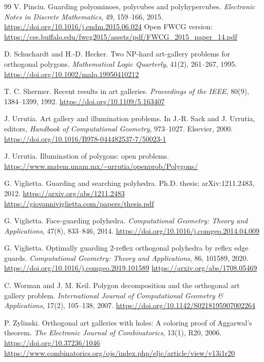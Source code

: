 \documentclass[11pt]{article}
\begin{document}
\begin{thebibliography}{99}
V. Pinciu.
\newblock Guarding polyominoes, polycubes and polyhypercubes.
\newblock \emph{Electronic Notes in Discrete Mathematics}, 49, 159--166, 2015.
\newblock \url{https://doi.org/10.1016/j.endm.2015.06.024}
\newblock Open FWCG version:
\url{https://cse.buffalo.edu/fwcg2015/assets/pdf/FWCG_2015_paper_14.pdf}

D. Schuchardt and H.-D. Hecker.
\newblock Two NP-hard art-gallery problems for orthogonal polygons.
\newblock \emph{Mathematical Logic Quarterly}, 41(2), 261--267, 1995.
\newblock \url{https://doi.org/10.1002/malq.19950410212}

T. C. Shermer.
\newblock Recent results in art galleries.
\newblock \emph{Proceedings of the IEEE}, 80(9), 1384--1399, 1992.
\newblock \url{https://doi.org/10.1109/5.163407}

J. Urrutia.
\newblock Art gallery and illumination problems.
\newblock In J.-R. Sack and J. Urrutia, editors, \emph{Handbook of Computational Geometry}, 973--1027. Elsevier, 2000.
\newblock \url{https://doi.org/10.1016/B978-044482537-7/50023-1}

J. Urrutia.
\newblock Illumination of polygons: open problems.
\newblock \url{https://www.matem.unam.mx/~urrutia/openprob/Polygons/}

G. Viglietta.
\newblock Guarding and searching polyhedra.
\newblock Ph.D. thesis; arXiv:1211.2483, 2012.
\newblock \url{https://arxiv.org/abs/1211.2483}
\newblock \url{https://giovanniviglietta.com/papers/thesis.pdf}

G. Viglietta.
\newblock Face-guarding polyhedra.
\newblock \emph{Computational Geometry: Theory and Applications}, 47(8), 833--846, 2014.
\newblock \url{https://doi.org/10.1016/j.comgeo.2014.04.009}

G. Viglietta.
\newblock Optimally guarding 2-reflex orthogonal polyhedra by reflex edge guards.
\newblock \emph{Computational Geometry: Theory and Applications}, 86, 101589, 2020.
\newblock \url{https://doi.org/10.1016/j.comgeo.2019.101589}
\newblock \url{https://arxiv.org/abs/1708.05469}

C. Worman and J. M. Keil.
\newblock Polygon decomposition and the orthogonal art gallery problem.
\newblock \emph{International Journal of Computational Geometry \& Applications}, 17(2), 105--138, 2007.
\newblock \url{https://doi.org/10.1142/S0218195907002264}

P. Zylinski.
\newblock Orthogonal art galleries with holes: A coloring proof of Aggarwal's theorem.
\newblock \emph{The Electronic Journal of Combinatorics}, 13(1), R20, 2006.
\newblock \url{https://doi.org/10.37236/1046}
\newblock \url{https://www.combinatorics.org/ojs/index.php/eljc/article/view/v13i1r20}

\end{thebibliography}
\end{document}
